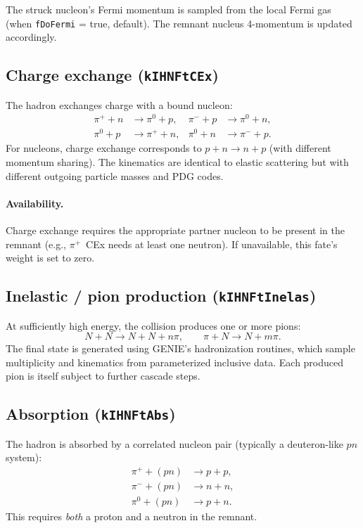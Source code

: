 \documentclass[11pt,a4paper]{article}
\begin{document}
The struck nucleon's Fermi momentum is sampled from the local Fermi gas
(when \texttt{fDoFermi} = true, default).  The remnant nucleus 4-momentum
is updated accordingly.

\subsection{Charge exchange (\texttt{kIHNFtCEx})}

The hadron exchanges charge with a bound nucleon:
\begin{align}
  \pi^{+} + n &\to \pi^{0} + p, &
  \pi^{-} + p &\to \pi^{0} + n, \\
  \pi^{0} + p &\to \pi^{+} + n, &
  \pi^{0} + n &\to \pi^{-} + p.
\end{align}
For nucleons, charge exchange corresponds to $p + n \to n + p$ (with
different momentum sharing).  The kinematics are identical to elastic
scattering but with different outgoing particle masses and PDG codes.

\paragraph{Availability.}
Charge exchange requires the appropriate partner nucleon to be present
in the remnant (e.g., $\pi^{+}$~CEx needs at least one neutron).  If
unavailable, this fate's weight is set to zero.

\subsection{Inelastic / pion production (\texttt{kIHNFtInelas})}

At sufficiently high energy, the collision produces one or more pions:
\begin{equation}
  N + N \to N + N + n\pi, \qquad
  \pi + N \to N + m\pi.
\end{equation}
The final state is generated using GENIE's hadronization routines, which
sample multiplicity and kinematics from parameterized inclusive data.
Each produced pion is itself subject to further cascade steps.

\subsection{Absorption (\texttt{kIHNFtAbs})}

The hadron is absorbed by a correlated nucleon pair (typically a
deuteron-like $pn$ system):
\begin{align}
  \pi^{+} + (pn) &\to p + p, \\
  \pi^{-} + (pn) &\to n + n, \\
  \pi^{0} + (pn) &\to p + n.
\end{align}
This requires \emph{both} a proton and a neutron in the remnant.
\end{document}
